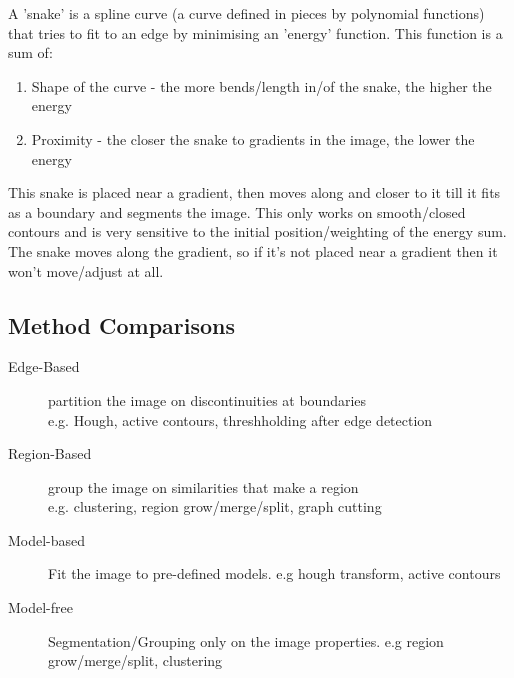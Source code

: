 A 'snake' is a spline curve (a curve defined in pieces by polynomial functions) that tries to fit to an edge by minimising an 'energy' function. This function is a sum of:
\begin{enumerate}
    \item Shape of the curve - the more bends/length in/of the snake, the higher the energy
    \item Proximity - the closer the snake to gradients in the image, the lower the energy
\end{enumerate}
This snake is placed near a gradient, then moves along and closer to it till it fits as a boundary and segments the image. This only works on smooth/closed contours and is very sensitive to the initial position/weighting of the energy sum. The snake moves along the gradient, so if it's not placed near a gradient then it won't move/adjust at all.

\subsection{Method Comparisons}
\begin{description}
    \item [Edge-Based] partition the image on discontinuities at boundaries \\ \quad\quad e.g. Hough, active contours, threshholding after edge detection
    \item[Region-Based] group the image on similarities that make a region \\ \quad\quad e.g. clustering, region grow/merge/split, graph cutting
\end{description}
\begin{description}
    \item [Model-based] Fit the image to pre-defined models. e.g hough transform, active contours
    \item [Model-free] Segmentation/Grouping only on the image properties. e.g region grow/merge/split, clustering
\end{description}
